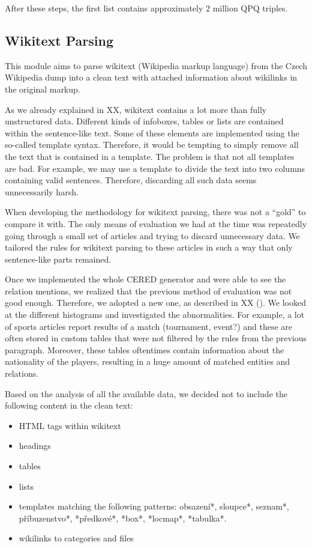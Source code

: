 After these steps, the first list contains approximately 2 million QPQ triples.

\subsection{Wikitext Parsing}

\label{sec:wikiperia_parsing_implementation}

This module aims to parse wikitext (Wikipedia markup language) from the Czech Wikipedia dump into a clean text with attached information about wikilinks in the original markup.

As we already explained in XX, wikitext contains a lot more than fully unstructured data. Different kinds of infoboxes, tables or lists are contained within the sentence-like text. Some of these elements are implemented using the so-called template syntax. Therefore, it would be tempting to simply remove all the text that is contained in a template. The problem is that not all templates are bad. For example, we may use a template to divide the text into two columns containing valid sentences. Therefore, discarding all such data seems unnecessarily harsh.

When developing the methodology for wikitext parsing, there was not a “gold” to compare it with. The only means of evaluation we had at the time was repeatedly going through a small set of articles and trying to discard unnecessary data. We tailored the rules for wikitext parsing to these articles in such a way that only sentence-like parts remained. 

Once we implemented the whole CERED generator and were able to see the relation mentions, we realized that the previous method of evaluation was not good enough. Therefore, we adopted a new one, as described in XX (). We looked at the different histograms and investigated the abnormalities. For example, a lot of sports articles report results of a match (tournament, event?) and these are often stored in custom tables that were not filtered by the rules from the previous paragraph. Moreover, these tables oftentimes contain information about the nationality of the players, resulting in a huge amount of matched entities and relations.

Based on the analysis of all the available data, we decided not to include the following content in the clean text:
\begin{itemize}

\item HTML tags within wikitext
\item headings
\item tables
\item lists
\item templates matching the following patterns: obsazení*, sloupce*, seznam*, příbuzenstvo*, *předkové*, *box*, *locmap*, *tabulka*.
\item wikilinks to categories and files

\end{itemize}

